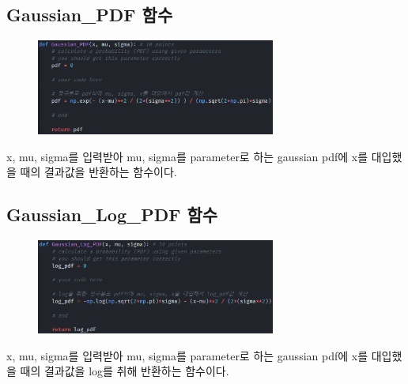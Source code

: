 \documentclass[12pt]{article}
\begin{document}
\subsection{Gaussian\_PDF 함수}
\begin{figure}[h]
	\includegraphics[width=0.7\textwidth]{figures/image05.png}
\end{figure}
x, mu, sigma를 입력받아 mu, sigma를 parameter로 하는 gaussian pdf에 x를 대입했을 때의 결과값을 반환하는 함수이다.

\subsection{Gaussian\_Log\_PDF 함수}
\begin{figure}[!h]
	\includegraphics[width=0.7\textwidth]{figures/image06.png}
\end{figure}
x, mu, sigma를 입력받아 mu, sigma를 parameter로 하는 gaussian pdf에 x를 대입했을 때의 결과값을 log를 취해 반환하는 함수이다.
\end{document}
